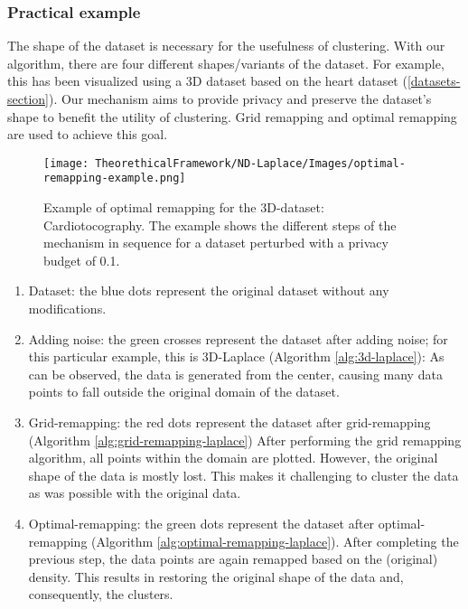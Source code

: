 \subsubsection{Practical example}
The shape of the dataset is necessary for the usefulness of clustering.
With our algorithm, there are four different shapes/variants of the dataset.
For example, this has been visualized using a 3D dataset based on the heart dataset (\ref{datasets-section}).
Our mechanism aims to provide privacy and preserve the dataset's shape to benefit the utility of clustering.
Grid remapping and optimal remapping are used to achieve this goal.

\begin{figure}[H]
  \texttt{[image: TheorethicalFramework/ND-Laplace/Images/optimal-remapping-example.png]}
  \caption{Example of optimal remapping for the 3D-dataset: Cardiotocography. The example shows the different steps of the mechanism in sequence for a dataset perturbed with a privacy budget of 0.1.}
\end{figure}

\begin{enumerate}
  \item Dataset: the blue dots represent the original dataset without any modifications.
  \item Adding noise: the green crosses represent the dataset after adding noise; for this particular example, this is 3D-Laplace (Algorithm \ref{alg:3d-laplace}):
        As can be observed, the data is generated from the center, causing many data points to fall outside the original domain of the dataset.
  \item Grid-remapping: the red dots represent the dataset after grid-remapping (Algorithm \ref{alg:grid-remapping-laplace})
        After performing the grid remapping algorithm, all points within the domain are plotted.
        However, the original shape of the data is mostly lost.
        This makes it challenging to cluster the data as was possible with the original data.
  \item Optimal-remapping: the green dots represent the dataset after optimal-remapping (Algorithm \ref{alg:optimal-remapping-laplace}).
        After completing the previous step, the data points are again remapped based on the (original) density.
        This results in restoring the original shape of the data and, consequently, the clusters.
\end{enumerate}
